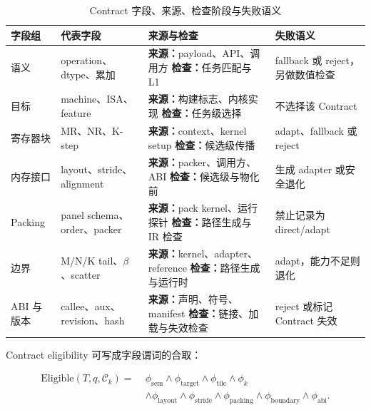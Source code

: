 \begin{table}[!htbp]
  \centering
  \caption{Contract 字段、来源、检查阶段与失败语义}
  \label{tab:chapter3-contract-fields}
  \begingroup
  \begin{tabularx}{\textwidth}{
    @{}
    >{\centering\arraybackslash}p{}
    >{\raggedright\arraybackslash}p{}
    >{\raggedright\arraybackslash}p{}
    >{\raggedright\arraybackslash}X
    @{}
  }
    \toprule
    \textbf{字段组} & \textbf{代表字段} & \textbf{来源与检查} &
    \textbf{失败语义} \\
    \midrule
    语义 &
    operation、dtype、累加 &
    \textbf{来源：}payload、API、调用方
    \newline \textbf{检查：}任务匹配与 L1 &
    fallback 或 reject，另做数值检查 \\
    目标 &
    machine、ISA、feature &
    \textbf{来源：}构建标志、内核实现
    \newline \textbf{检查：}任务级选择 &
    不选择该 Contract \\
    寄存器块 &
    MR、NR、K-step &
    \textbf{来源：}context、kernel setup
    \newline \textbf{检查：}候选级传播 &
    adapt、fallback 或 reject \\
    内存接口 &
    layout、stride、alignment &
    \textbf{来源：}packer、调用方、ABI
    \newline \textbf{检查：}候选级与物化前 &
    生成 adapter 或安全退化 \\
    Packing &
    panel schema、order、packer &
    \textbf{来源：}pack kernel、运行探针
    \newline \textbf{检查：}路径生成与 IR 检查 &
    禁止记录为 direct/adapt \\
    边界 &
    M/N/K tail、$\beta$、scatter &
    \textbf{来源：}kernel、adapter、reference
    \newline \textbf{检查：}路径生成与运行时 &
    adapt，能力不足则退化 \\
    ABI 与版本 &
    callee、aux、revision、hash &
    \textbf{来源：}声明、符号、manifest
    \newline \textbf{检查：}链接、加载与失效检查 &
    reject 或标记 Contract 失效 \\
    \bottomrule
  \end{tabularx}
  \endgroup
\end{table}

Contract eligibility 可写成字段谓词的合取：

\begin{equation}
\begin{aligned}
\mathrm{Eligible}(T,q,\mathcal{C}_k)=\;&
\phi_{\mathrm{sem}}\land\phi_{\mathrm{target}}
\land\phi_{\mathrm{tile}}\land\phi_{k}\\
&\land\phi_{\mathrm{layout}}\land\phi_{\mathrm{stride}}
\land\phi_{\mathrm{packing}}\land\phi_{\mathrm{boundary}}
\land\phi_{\mathrm{abi}} .
\end{aligned}
\label{eq:chapter3-eligibility}
\end{equation}

